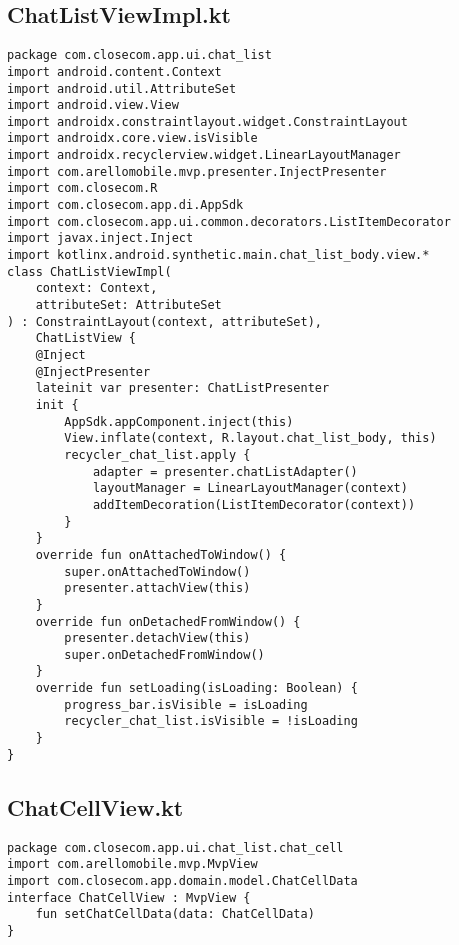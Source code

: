 \documentclass[listing]{espd}
\begin{document}
\subsection{ChatListViewImpl.kt}
\begin{verbatim}
package com.closecom.app.ui.chat_list
import android.content.Context
import android.util.AttributeSet
import android.view.View
import androidx.constraintlayout.widget.ConstraintLayout
import androidx.core.view.isVisible
import androidx.recyclerview.widget.LinearLayoutManager
import com.arellomobile.mvp.presenter.InjectPresenter
import com.closecom.R
import com.closecom.app.di.AppSdk
import com.closecom.app.ui.common.decorators.ListItemDecorator
import javax.inject.Inject
import kotlinx.android.synthetic.main.chat_list_body.view.*
class ChatListViewImpl(
    context: Context,
    attributeSet: AttributeSet
) : ConstraintLayout(context, attributeSet),
    ChatListView {
    @Inject
    @InjectPresenter
    lateinit var presenter: ChatListPresenter
    init {
        AppSdk.appComponent.inject(this)
        View.inflate(context, R.layout.chat_list_body, this)
        recycler_chat_list.apply {
            adapter = presenter.chatListAdapter()
            layoutManager = LinearLayoutManager(context)
            addItemDecoration(ListItemDecorator(context))
        }
    }
    override fun onAttachedToWindow() {
        super.onAttachedToWindow()
        presenter.attachView(this)
    }
    override fun onDetachedFromWindow() {
        presenter.detachView(this)
        super.onDetachedFromWindow()
    }
    override fun setLoading(isLoading: Boolean) {
        progress_bar.isVisible = isLoading
        recycler_chat_list.isVisible = !isLoading
    }
}
\end{verbatim}

\subsection{ChatCellView.kt}
\begin{verbatim}
package com.closecom.app.ui.chat_list.chat_cell
import com.arellomobile.mvp.MvpView
import com.closecom.app.domain.model.ChatCellData
interface ChatCellView : MvpView {
    fun setChatCellData(data: ChatCellData)
}
\end{verbatim}
\end{document}
